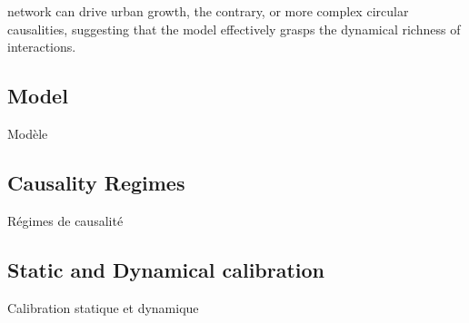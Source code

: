network can drive urban growth, the contrary, or more complex circular causalities, suggesting that the model effectively grasps the dynamical richness of interactions.


\subsection{Model}{Modèle}



\subsection{Causality Regimes}{Régimes de causalité}



\subsection{Static and Dynamical calibration}{Calibration statique et dynamique}







